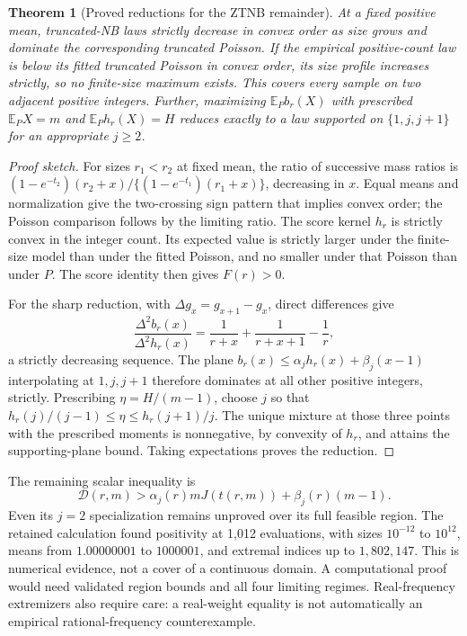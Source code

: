 \documentclass[12pt]{article}
\newtheorem{theorem}{Theorem}[section]
\theoremstyle{definition}
\theoremstyle{remark}
\newcommand{\E}{\mathbb E}
\begin{document}
\begin{theorem}[Proved reductions for the ZTNB remainder]\label{thm:reduction}
At a fixed positive mean, truncated-NB laws strictly decrease in convex
order as size grows and dominate the corresponding truncated Poisson.
If the empirical positive-count law is below its fitted truncated Poisson
in convex order, its size profile increases strictly, so no finite-size
maximum exists. This covers every sample on two adjacent positive integers.
Further, maximizing $\E_Pb_r(X)$ with prescribed $\E_PX=m$ and
$\E_Ph_r(X)=H$ reduces exactly to a law supported on $\{1,j,j+1\}$ for
an appropriate $j\ge2$.
\end{theorem}
\begin{proof}[Proof sketch]
For sizes $r_1<r_2$ at fixed mean, the ratio of successive mass ratios
is $(1-e^{-t_2})(r_2+x)/\{(1-e^{-t_1})(r_1+x)\}$, decreasing in $x$.
Equal means and normalization give the two-crossing sign pattern that
implies convex order; the Poisson comparison follows by the limiting
ratio. The score kernel $h_r$ is strictly convex in the integer count.
Its expected value is strictly larger under the finite-size model than
under the fitted Poisson, and no smaller under that Poisson than under
$P$. The score identity then gives $F(r)>0$.

For the sharp reduction, with $\Delta g_x=g_{x+1}-g_x$, direct differences
give
\[
 \frac{\Delta^2 b_r(x)}{\Delta^2 h_r(x)}
   =\frac1{r+x}+\frac1{r+x+1}-\frac1r,
\]
a strictly decreasing sequence. The plane
$b_r(x)\le\alpha_jh_r(x)+\beta_j(x-1)$ interpolating at $1,j,j+1$
therefore dominates at all other positive integers, strictly. Prescribing
$\eta=H/(m-1)$, choose $j$ so that
$h_r(j)/(j-1)\le\eta\le h_r(j+1)/j$. The unique mixture at those three
points with the prescribed moments is nonnegative, by convexity of $h_r$,
and attains the supporting-plane bound. Taking expectations proves the
reduction.
\end{proof}
The remaining scalar inequality is
\[
 \mathcal D(r,m)>\alpha_j(r)mJ(t(r,m))+\beta_j(r)(m-1).
\]
Even its $j=2$ specialization remains unproved over its full feasible
region. The retained calculation found positivity at 1,012 evaluations,
with sizes $10^{-12}$ to $10^{12}$, means from $1.00000001$ to $1000001$,
and extremal indices up to $1,802,147$. This is numerical evidence,
not a cover of a continuous domain. A computational proof would need
validated region bounds and all four limiting regimes. Real-frequency
extremizers also require care: a real-weight equality is not automatically
an empirical rational-frequency counterexample.
\end{document}
